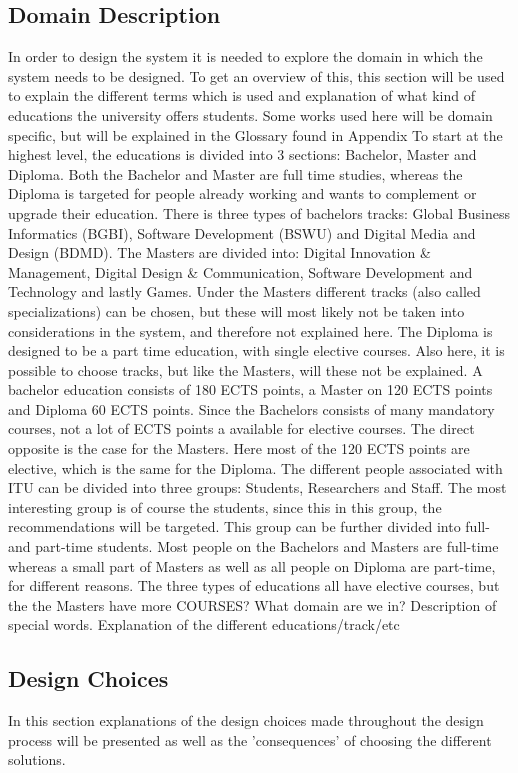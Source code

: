 \subsection{Domain Description}
In order to design the system it is needed to explore the domain in which the system needs to be designed. To get an overview of this, this section will be used to explain the different terms which is used and explanation of what kind of educations the university offers students. Some works used here will be domain specific, but will be explained in the Glossary found in Appendix 
To start at the highest level, the educations is divided into 3 sections: Bachelor, Master and Diploma. Both the Bachelor and Master are full time studies, whereas the Diploma is targeted for people already working and wants to complement or upgrade their education. There is three types of bachelors tracks: Global Business Informatics (BGBI), Software Development (BSWU) and Digital Media and Design (BDMD). The Masters are divided into: Digital Innovation \& Management, Digital Design \& Communication, Software Development and Technology and lastly Games. Under the Masters different tracks (also called specializations) can be chosen, but these will most likely not be taken into considerations in the system, and therefore not explained here. The Diploma is designed to be a part time education, with single elective courses. Also here, it is possible to choose tracks, but like the Masters, will these not be explained. 
A bachelor education consists of 180 ECTS points, a Master on 120 ECTS points and Diploma 60 ECTS points. Since the Bachelors consists of many mandatory courses, not a lot of ECTS points a available for elective courses. The direct opposite is the case for the Masters. Here most of the 120 ECTS points are elective, which is the same for the Diploma. 
The different people associated with ITU can be divided into three groups: Students, Researchers and Staff. The most interesting group is of course the students, since this in this group, the recommendations will be targeted. This group can be further divided into full- and part-time students. Most people on the Bachelors and Masters are full-time whereas a small part of Masters as well as all people on Diploma are part-time, for different reasons. 
The three types of educations all have elective courses, but the the Masters have more 
COURSES?
What domain are we in? Description of special words. Explanation of the different educations/track/etc

\subsection{Design Choices}
In this section explanations of the design choices made throughout the design process will be presented as well as the 'consequences' of choosing the different solutions. 
